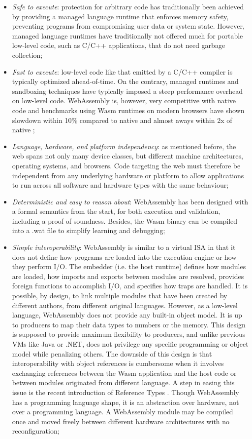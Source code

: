 \documentclass{ieeeaccess}
\begin{document}
\begin{itemize}
    \item \emph{Safe to execute}: protection for arbitrary code has traditionally been achieved by providing a managed language runtime that enforces memory safety, preventing programs from compromising user data or system state. However, managed language runtimes have traditionally not offered much for portable low-level code, such as C/C++ applications, that do not need garbage collection;
    \item \emph{Fast to execute}: low-level code like that emitted by a C/C++ compiler is typically optimized ahead-of-time. On the contrary, managed runtimes and sandboxing techniques have typically imposed a steep performance overhead on low-level code. WebAssembly is, however, very competitive with native code and benchmarks using Wasm runtimes on modern browsers have shown slowdown within 10\% compared to native and almost aways within 2x of native \cite{wasm};
    \item \emph{Language, hardware, and platform independency}: as mentioned before, the web spans not only many device classes, but different machine architectures, operating systems, and browsers. Code targeting the web must therefore be independent from any underlying hardware or platform to allow applications to run across all software and hardware types with the same behaviour;
    \item \emph{Deterministic and easy to reason about}: WebAssembly has been designed with a formal semantics from the start, for both execution and validation, including a proof of soundness. Besides, the Wasm binary can be compiled into a .wat file to simplify learning and debugging;
    \item \emph{Simple interoperability}: WebAssembly is similar to a virtual ISA in that it does not define how programs are loaded into the execution engine or how they perform I/O. The embedder (i.e. the host runtime) defines how modules are loaded, how imports and exports between modules are resolved, provides foreign functions to accomplish I/O, and specifies how traps are handled. It is possible, by design, to link multiple modules that have been created by different authors, from different original languages. However, as a low-level language, WebAssembly does not provide any built-in object model. It is up to producers to map their data types to numbers or the memory. This design is supposed to provide maximum flexibility to producers, and unlike previous VMs like Java or .NET, does not privilege any specific programming or object model while penalizing others. The downside of this design is that interoperability with object references is cumbersome when it involves exchanging references between the Wasm application and the host code or between modules originated from different language. A step in easing this issue is the recent introduction of Reference Types \cite{reference-types}. Though WebAssembly has a programming language shape, it is an abstraction over hardware, not over a programming language. A WebAssembly module may be compiled once and moved freely between different hardware architectures with no reconfiguration;

\end{itemize}
\end{document}
